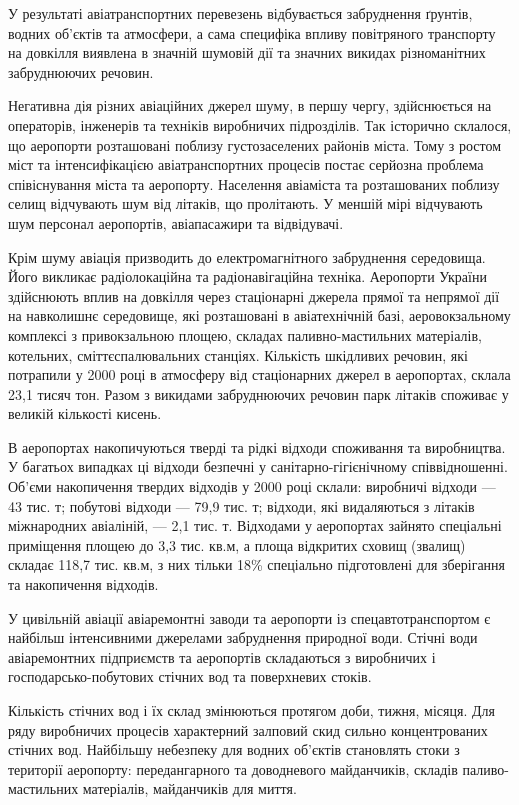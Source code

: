 У результаті авіатранспортних перевезень відбувається забруднення ґрунтів, водних об’єктів та атмосфери, а сама специфіка впливу повітряного транспорту на довкілля виявлена в значній шумовій дії та значних викидах різноманітних забруднюючих речовин.

Негативна дія різних авіаційних джерел шуму, в першу чергу, здійснюється на операторів, інженерів та техніків виробничих підрозділів. Так історично склалося, що аеропорти розташовані поблизу густозаселених районів міста. Тому з ростом міст та інтенсифікацією авіатранспортних процесів постає серйозна проблема співіснування міста та аеропорту. Населення авіаміста та розташованих поблизу селищ відчувають шум від літаків, що пролітають. У меншій мірі відчувають шум персонал аеропортів, авіапасажири та відвідувачі.

Крім шуму авіація призводить до електромагнітного забруднення середовища. Його викликає радіолокаційна та радіонавігаційна техніка. Аеропорти України здійснюють вплив на довкілля через стаціонарні джерела прямої та непрямої дії на навколишнє середовище, які розташовані в авіатехнічній базі, аеровокзальному комплексі з привокзальною площею, складах паливно-мастильних матеріалів, котельних, сміттєспалювальних станціях. Кількість шкідливих речовин, які потрапили у 2000 році в атмосферу від стаціонарних джерел в аеропортах, склала 23,1 тисяч тон. Разом з викидами забруднюючих речовин парк літаків споживає у великій кількості кисень. 

В аеропортах накопичуються тверді та рідкі відходи споживання та виробництва. У багатьох випадках ці відходи безпечні у санітарно-гігієнічному співвідношенні. Об’єми накопичення твердих відходів у 2000 році склали: виробничі відходи --- 43 тис. т; побутові відходи --- 79,9 тис. т; відходи, які видаляються з літаків міжнародних авіаліній, --- 2,1 тис. т. Відходами у аеропортах зайнято спеціальні приміщення площею до 3,3 тис. кв.м, а площа відкритих сховищ (звалищ) складає 118,7 тис. кв.м, з них тільки 18\% спеціально підготовлені для зберігання та накопичення відходів.

У цивільній авіації авіаремонтні заводи та аеропорти із спецавтотранспортом є найбільш інтенсивними джерелами забруднення природної води. Стічні води авіаремонтних підприємств та аеропортів складаються з виробничих і господарсько-побутових стічних вод та поверхневих стоків. 

Кількість стічних вод і їх склад змінюються протягом доби, тижня, місяця. Для ряду виробничих процесів характерний залповий скид сильно концентрованих стічних вод. Найбільшу небезпеку для водних об’єктів становлять стоки з території аеропорту: передангарного та доводневого майданчиків, складів паливо-мастильних матеріалів, майданчиків для миття. 

